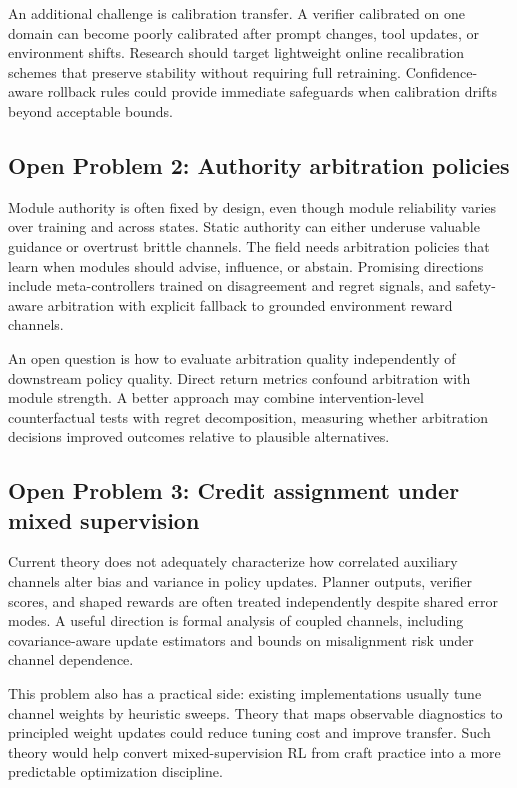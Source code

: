 \documentclass[pdflatex,sn-mathphys-num]{sn-jnl}
\begin{document}
An additional challenge is calibration transfer. A verifier calibrated on one domain can become poorly calibrated after prompt changes, tool updates, or environment shifts. Research should target lightweight online recalibration schemes that preserve stability without requiring full retraining. Confidence-aware rollback rules could provide immediate safeguards when calibration drifts beyond acceptable bounds.

\subsection{Open Problem 2: Authority arbitration policies}
Module authority is often fixed by design, even though module reliability varies over training and across states. Static authority can either underuse valuable guidance or overtrust brittle channels. The field needs arbitration policies that learn when modules should advise, influence, or abstain. Promising directions include meta-controllers trained on disagreement and regret signals, and safety-aware arbitration with explicit fallback to grounded environment reward channels.

An open question is how to evaluate arbitration quality independently of downstream policy quality. Direct return metrics confound arbitration with module strength. A better approach may combine intervention-level counterfactual tests with regret decomposition, measuring whether arbitration decisions improved outcomes relative to plausible alternatives.

\subsection{Open Problem 3: Credit assignment under mixed supervision}
Current theory does not adequately characterize how correlated auxiliary channels alter bias and variance in policy updates. Planner outputs, verifier scores, and shaped rewards are often treated independently despite shared error modes. A useful direction is formal analysis of coupled channels, including covariance-aware update estimators and bounds on misalignment risk under channel dependence.

This problem also has a practical side: existing implementations usually tune channel weights by heuristic sweeps. Theory that maps observable diagnostics to principled weight updates could reduce tuning cost and improve transfer. Such theory would help convert mixed-supervision RL from craft practice into a more predictable optimization discipline.
\end{document}
